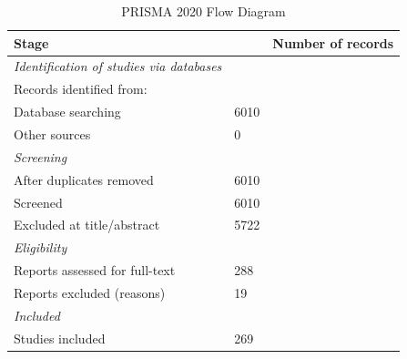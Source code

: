 \begin{table}[htbp]
\centering
\caption{PRISMA 2020 Flow Diagram}
\label{tab:prisma-flow}
\begin{tabular}{llr}
\hline
\textbf{Stage} & & \textbf{Number of records} \\ 
\hline
\hline
\textit{Identification of studies via databases} &  &  \\ 
  \hspace{1em} Records identified from: &  &  \\ 
    \hspace{2em} Database searching & 6010 &  \\ 
    \hspace{2em} Other sources & 0 &  \\ 
\hline
\textit{Screening} &  &  \\ 
  \hspace{1em} After duplicates removed & 6010 &  \\ 
  \hspace{1em} Screened & 6010 &  \\ 
  \hspace{1em} Excluded at title/abstract & 5722 &  \\ 
\hline
\textit{Eligibility} &  &  \\ 
  \hspace{1em} Reports assessed for full-text & 288 &  \\ 
  \hspace{1em} Reports excluded (reasons) & 19 &  \\ 
\hline
\textit{Included} &  &  \\ 
  \hspace{1em} Studies included & 269 &  \\ 
\hline
\end{tabular}
\end{table}
